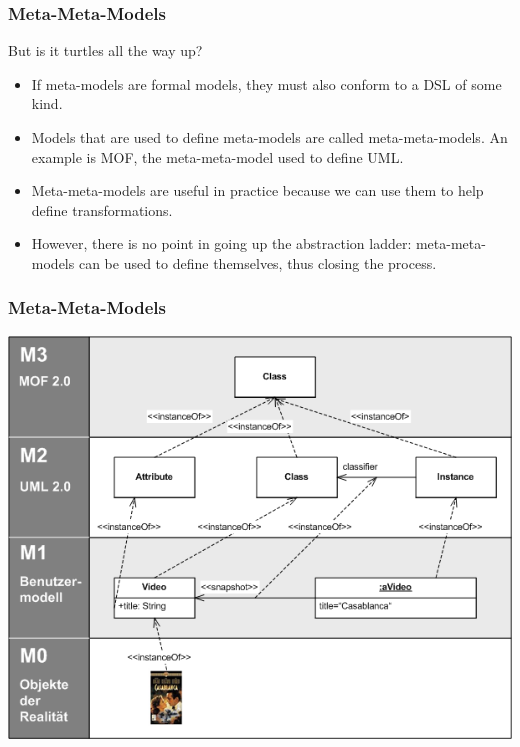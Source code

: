 \documentclass{beamer}
\begin{document}
\begin{frame}
\frametitle{Meta-Meta-Models}

But is it turtles all the way up?
\pause

\begin{itemize}
  \item If meta-models are formal models, they must also conform to a
    DSL of some kind.
    \pause
  \item Models that are used to define meta-models are called
    meta-meta-models. An example is MOF, the meta-meta-model used to
    define UML.
    \pause
  \item Meta-meta-models are useful in practice because we can use
    them to help define transformations.
    \pause
  \item However, there is no point in going up the abstraction ladder:
    meta-meta-models can be used to define themselves, thus closing
    the process.
\end{itemize}

\end{frame}

\begin{frame}
\frametitle{Meta-Meta-Models}

\begin{center}
  \includegraphics[scale=0.4]{images/uml-m0-m3-wikipedia.png}
\end{center}

\end{frame}
\end{document}
